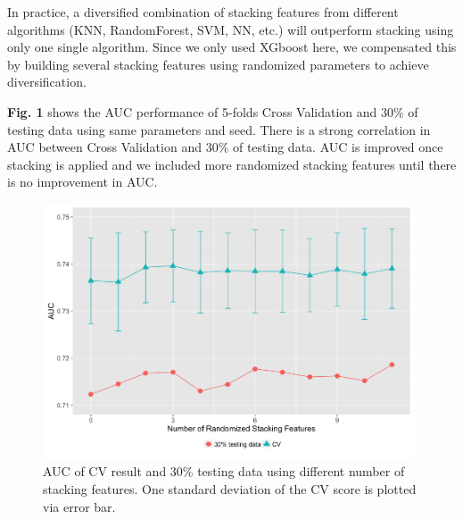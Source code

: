 \documentclass[a4paper]{llncs}
\makeatletter
\def\BState{\State\hskip-\ALG@thistlm}
\makeatother
\begin{document}
In practice, a diversified combination of stacking features from different algorithms (KNN, RandomForest, SVM, NN, etc.)
will outperform stacking using only one single algorithm.
Since we only used XGboost here, we compensated this by building several stacking features using randomized parameters to achieve diversification.


\textbf{Fig. 1} shows the AUC performance of 5-folds Cross Validation and 30\% of testing data using same parameters and seed.
 There is a strong correlation in AUC between Cross Validation and 30\% of testing data.
 AUC is improved once stacking is applied and we included more randomized stacking features until there is no improvement in AUC.

\begin{figure}[ht!]
\centering
\includegraphics[width=110mm]{Rplot.png}
\caption{AUC of CV result and 30\% testing data using different number of stacking features. One standard deviation of the CV score is plotted via error bar. \label{overflow}}
\end{figure}





\end{document}
